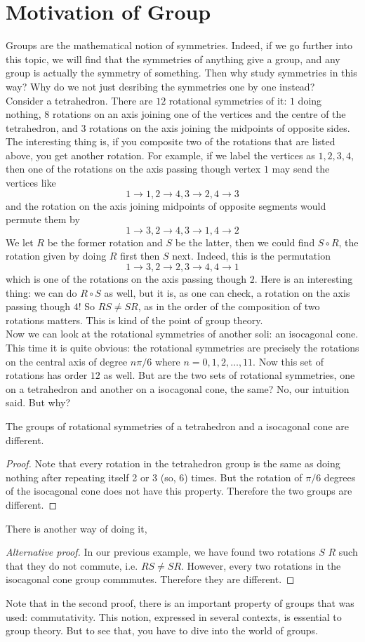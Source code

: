 \section{Motivation of Group}
Groups are the mathematical notion of symmetries.
Indeed, if we go further into this topic, we will find that the symmetries of anything give a group, and any group is actually the symmetry of something.
Then why study symmetries in this way?
Why do we not just desribing the symmetries one by one instead?\\
Consider a tetrahedron.
There are $12$ rotational symmetries of it: $1$ doing nothing, $8$ rotations on an axis joining one of the vertices and the centre of the tetrahedron, and $3$ rotations on the axis joining the midpoints of opposite sides.
The interesting thing is, if you composite two of the rotations that are listed above, you get another rotation.
For example, if we label the vertices as $1,2,3,4$, then one of the rotations on the axis passing though vertex $1$ may send the vertices like
$$1\to 1, 2\to 4, 3\to 2, 4\to 3$$
and the rotation on the axis joining midpoints of opposite segments would permute them by
$$1\to 3, 2\to 4, 3\to 1, 4\to 2$$
We let $R$ be the former rotation and $S$ be the latter, then we could find $S\circ R$, the rotation given by doing $R$ first then $S$ next.
Indeed, this is the permutation
$$1\to 3, 2\to 2, 3\to 4, 4\to 1$$
which is one of the rotations on the axis passing though $2$.
Here is an interesting thing: we can do $R\circ S$ as well, but it is, as one can check, a rotation on the axis passing though $4$!
So $RS\neq SR$, as in the order of the composition of two rotations matters.
This is kind of the point of group theory.\\
Now we can look at the rotational symmetries of another soli: an isocagonal cone.
This time it is quite obvious: the rotational symmetries are precisely the rotations on the central axis of degree $n\pi/6$ where $n=0,1,2,\ldots, 11$.
Now this set of rotations has order $12$ as well.
But are the two sets of rotational symmetries, one on a tetrahedron and another on a isocagonal cone, the same?
No, our intuition said. But why?
\begin{proposition}
    The groups of rotational symmetries of a tetrahedron and a isocagonal cone are different.
\end{proposition}
\begin{proof}
    Note that every rotation in the tetrahedron group is the same as doing nothing after repeating itself 2 or 3 (so, 6) times. 
    But the rotation of $\pi/6$ degrees of the isocagonal cone does not have this property.
    Therefore the two groups are different.
\end{proof}
There is another way of doing it,
\begin{proof}[Alternative proof]
    In our previous example, we have found two rotations $S$ $R$ such that they do not commute, i.e. $RS\neq SR$.
    However, every two rotations in the isocagonal cone group commmutes.
    Therefore they are different.
\end{proof}
Note that in the second proof, there is an important property of groups that was used: commutativity.
This notion, expressed in several contexts, is essential to group theory.
But to see that, you have to dive into the world of groups.
